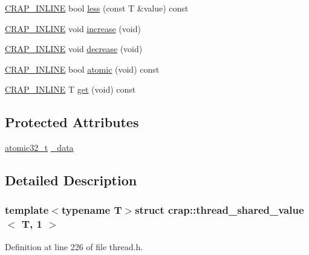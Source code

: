 \begin{DoxyCompactItemize}
\item 
\hyperlink{config__x86_8h_a5a40526b8d842e7ff731509998bb0f1c}{C\+R\+A\+P\+\_\+\+I\+N\+L\+I\+N\+E} bool \hyperlink{structcrap_1_1thread__shared__value_3_01_t_00_011_01_4_ae61a98f0a0e0cfc03adbb3da6284191f}{less} (const T \&value) const 
\item 
\hyperlink{config__x86_8h_a5a40526b8d842e7ff731509998bb0f1c}{C\+R\+A\+P\+\_\+\+I\+N\+L\+I\+N\+E} void \hyperlink{structcrap_1_1thread__shared__value_3_01_t_00_011_01_4_a706cad83ba459a04629d022941f6e48c}{increase} (void)
\item 
\hyperlink{config__x86_8h_a5a40526b8d842e7ff731509998bb0f1c}{C\+R\+A\+P\+\_\+\+I\+N\+L\+I\+N\+E} void \hyperlink{structcrap_1_1thread__shared__value_3_01_t_00_011_01_4_ab91a3ff3d71f921e22379c8a2f5d0e87}{decrease} (void)
\item 
\hyperlink{config__x86_8h_a5a40526b8d842e7ff731509998bb0f1c}{C\+R\+A\+P\+\_\+\+I\+N\+L\+I\+N\+E} bool \hyperlink{structcrap_1_1thread__shared__value_3_01_t_00_011_01_4_a5c0751b9573a1b003041fd39cdedd1c4}{atomic} (void) const 
\item 
\hyperlink{config__x86_8h_a5a40526b8d842e7ff731509998bb0f1c}{C\+R\+A\+P\+\_\+\+I\+N\+L\+I\+N\+E} T \hyperlink{structcrap_1_1thread__shared__value_3_01_t_00_011_01_4_ad5c99e9c26790e5185ce6172428a213f}{get} (void) const 
\end{DoxyCompactItemize}
\subsection*{Protected Attributes}
\begin{DoxyCompactItemize}
\item 
\hyperlink{structcrap_1_1atomic32__t}{atomic32\+\_\+t} \hyperlink{structcrap_1_1thread__shared__value_3_01_t_00_011_01_4_a16c1fd53ff58565ee8c4e67397aa51b9}{\+\_\+data}
\end{DoxyCompactItemize}


\subsection{Detailed Description}
\subsubsection*{template$<$typename T$>$struct crap\+::thread\+\_\+shared\+\_\+value$<$ T, 1 $>$}



Definition at line 226 of file thread.\+h.




